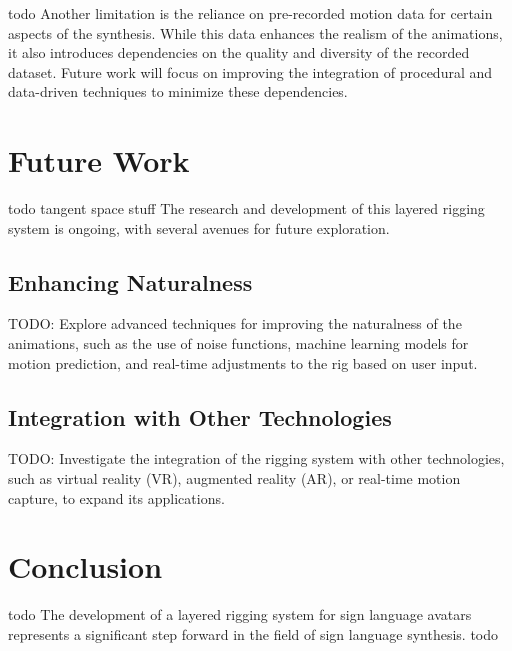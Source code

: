 \documentclass[../../main.tex]{subfiles}
\begin{document}
todo Another limitation is the reliance on pre-recorded motion data for certain aspects of the synthesis. While this data enhances the realism of the animations, it also introduces dependencies on the quality and diversity of the recorded dataset. Future work will focus on improving the integration of procedural and data-driven techniques to minimize these dependencies.

\section{Future Work}
todo tangent space stuff The research and development of this layered rigging system is ongoing, with several avenues for future exploration.

\subsection{Enhancing Naturalness}
TODO: Explore advanced techniques for improving the naturalness of the animations, such as the use of noise functions, machine learning models for motion prediction, and real-time adjustments to the rig based on user input.

\subsection{Integration with Other Technologies}
TODO: Investigate the integration of the rigging system with other technologies, such as virtual reality (VR), augmented reality (AR), or real-time motion capture, to expand its applications.

\section{Conclusion}
todo The development of a layered rigging system for sign language avatars represents a significant step forward in the field of sign language synthesis. todo
\end{document}
